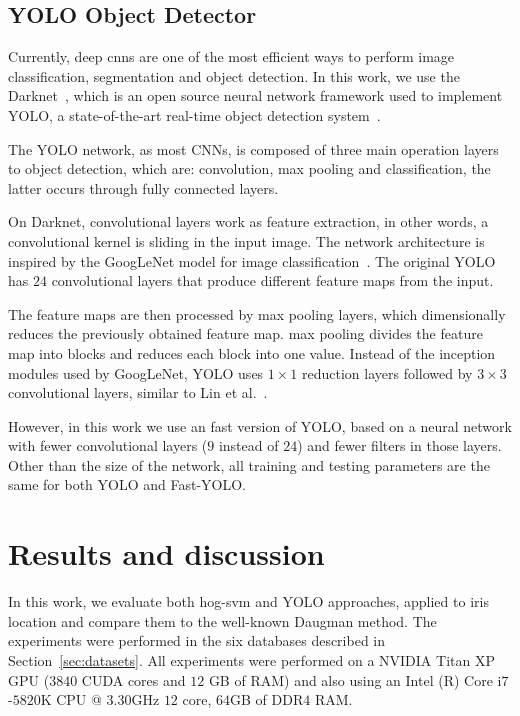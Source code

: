 \documentclass[conference]{IEEEtran}
\begin{document}
\subsection{YOLO Object Detector}
Currently, deep \glspl*{cnn} are one of the most efficient ways to perform image classification, segmentation and object detection.  
In this work, we use the Darknet~\cite{darknet13}, which is an open source neural network framework used to implement YOLO, a state-of-the-art real-time object detection system~\cite{redmon:2016}. 

The YOLO network, as most CNNs, is composed of three main operation layers to object detection, which are: convolution, max pooling and classification, the latter occurs through fully connected layers.

On Darknet, convolutional layers work as feature extraction, in other words, a convolutional kernel is sliding in the input image.
The network architecture is inspired by the GoogLeNet model for image classification~\cite{szegedy2015going}. 
The original YOLO has $24$ convolutional layers that produce different feature maps from the input. 

The feature maps are then processed by max pooling layers, which dimensionally reduces the previously obtained feature map.  max pooling divides the feature map into blocks and reduces each block into one value.
Instead of the inception modules used by GoogLeNet, YOLO uses $1 \times 1$ reduction layers followed by $3 \times 3$ convolutional layers, similar to Lin et al.~\cite{lin2013network}.

However, in this work we use an fast version of YOLO, based on a neural network with fewer convolutional layers ($9$ instead of $24$) and fewer filters in those layers. 
Other than the size of the network, all training and testing parameters are the same for both YOLO and Fast-YOLO.


\section{Results and discussion}
\label{sec:results}

In this work, we evaluate both \gls*{hog}-\gls*{svm} and YOLO approaches, applied to iris location and compare them to the well-known Daugman method. 
The experiments were performed in the six databases described in Section~\ref{sec:datasets}. 
All experiments were performed on a NVIDIA Titan XP GPU ($3840$ CUDA cores and $12$ GB of RAM) and also using an Intel (R) Core i$7$-$5820$K CPU @ $3.30$GHz $12$ core, $64$GB of DDR$4$ RAM.
\end{document}
